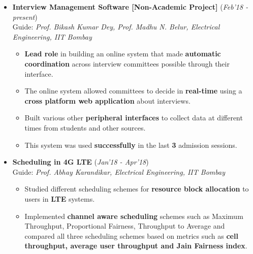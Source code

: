 \documentclass[10pt]{article}
\begin{document}
\begin{itemize}[leftmargin=0.4cm]

\item \textbf{Interview Management Software   \hspace{0.05cm} [Non-Academic Project]} 
\hfill{(\textit{Feb'18 - present})}\\
Guide: \textit{Prof. Bikash Kumar Dey, Prof. Madhu N. Belur, Electrical Engineering, IIT Bombay}

\begin{itemize}

	\item \textbf{Lead role }in building an online system that made \textbf{automatic
coordination }across interview committees possible through their interface.
	\item The online system allowed committees to decide in \textbf{real-time} using a \textbf{cross platform web application} about interviews.
	\item Built various other \textbf{peripheral
interfaces} to collect data at different times from students and other sources.
	\item This system was used \textbf{successfully} in the last \textbf{3} admission sessions.
\end{itemize}


	
\item \textbf{Scheduling in 4G LTE }
\hfill{(\textit{Jan'18 - Apr'18})}\\
Guide: \textit{Prof. Abhay Karandikar, Electrical Engineering, IIT Bombay}

	\begin{itemize}
	\item Studied different scheduling schemes for \textbf{resource block allocation} to users in \textbf{LTE} systems.
	\item Implemented \textbf{channel aware scheduling} schemes such as Maximum Throughput, Proportional Fairness, Throughput to Average and compared all three scheduling schemes based on metrics such as \textbf{cell throughput, average user throughput and Jain Fairness index}.
    \end{itemize}

	
	

\end{itemize}
\end{document}
